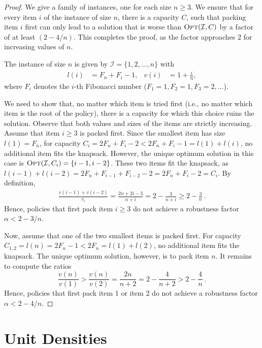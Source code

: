 \documentclass[11pt]{article}
\begin{document}
\begin{proof}
We give a family of instances, one for each size $n\geq3$. We ensure
that for every item $i$ of the instance of size $n$, there is a
capacity $C$, such that packing item $i$ first can only lead to
a solution that is worse than $\textsc{Opt}(\mathcal{I},C)$ by a
factor of at least $(2-4/n)$. This completes the proof, as the factor
approaches $2$ for increasing values of $n$.

The instance of size $n$ is given by $\mathcal{I}=\{1,2,\dots,n\}$
with
\begin{align*}
l(i) & =F_{n}+F_{i}-1, & v(i) & =1+\frac{i}{n},
\end{align*}
 where $F_{i}$ denotes the $i$-th Fibonacci number ($F_{1}=1,F_{2}=1,F_{3}=2,\dots$).

We need to show that, no matter which item is tried first (i.e., no
matter which item is the root of the policy), there is a capacity
for which this choice ruins the solution. Observe that both values
and sizes of the items are strictly increasing. Assume that item $i\geq3$
is packed first. Since the smallest item has size $l(1)=F_{n}$, for
capacity $C_{i}=2F_{n}+F_{i}-2<2F_{n}+F_{i}-1=l(1)+l(i)$, no additional
item fits the knapsack. However, the unique optimum solution in this
case is $\textsc{Opt}(\mathcal{I},C_{i})=\{i-1,i-2\}$. These two
items fit the knapsack, as $l(i-1)+l(i-2)=2F_{n}+F_{i-1}+F_{i-2}-2=2F_{n}+F_{i}-2=C_{i}$.
By definition, 
\begin{align*}
\frac{v(i-1)+v(i-2)}{v_{i}}=\frac{2n+2i-3}{n+i}=2-\frac{3}{n+i}\geq2-\frac{3}{n}\,.
\end{align*}
Hence, policies that first pack item $i\geq3$ do not achieve a robustness
factor $\alpha < 2-3/n$.

Now, assume that one of the two smallest items is packed first. For
capacity $C_{1,2}=l(n)=2F_{n}-1<2F_{n}=l(1)+l(2)$, no additional
item fits the knapsack. The unique optimum solution, however, is to
pack item $n$. It remains to compute the ratios 
\[
\frac{v(n)}{v(1)}>\frac{v(n)}{v(2)}=\frac{2n}{n+2}=2-\frac{4}{n+2}>2-\frac{4}{n}\,.
\]
Hence, policies that first pack item 1 or item 2 do not achieve a
robustness factor $\alpha < 2-4/n$.  
\end{proof}

\section{Unit Densities\label{sec:Unit-Densities}}
\end{document}
